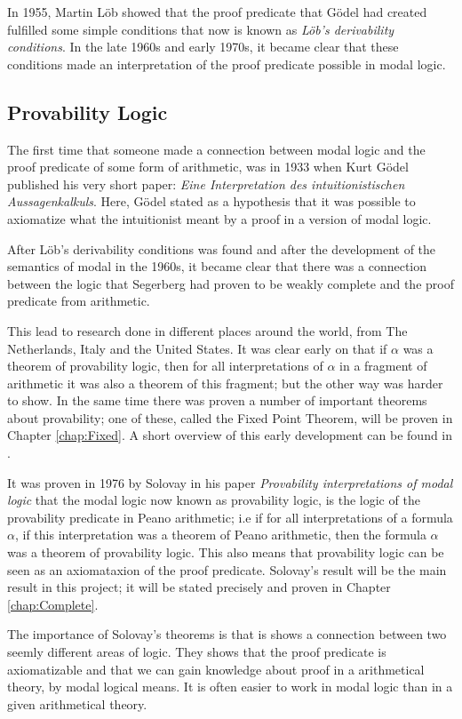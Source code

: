 \documentclass[../main.tex]{subfiles}
\begin{document}
In 1955, Martin Löb showed that the proof predicate that Gödel had created
fulfilled some simple conditions that now is known as \textit{Löb's derivability
conditions}. In the late 1960s and early 1970s, it became clear that these
conditions made an interpretation of the proof predicate possible in modal
logic.


\subsection{Provability Logic}
The first time that someone made a connection between modal logic and the proof
predicate of some form of arithmetic, was in 1933 when Kurt Gödel published his very short  paper:
\textit{Eine
Interpretation des intuitionistischen Aussagenkalkuls}. Here, Gödel
stated as a  hypothesis that it was possible to axiomatize what the
intuitionist meant by a proof in a version of modal logic.

After Löb's derivability conditions was found and after the development of the
semantics of modal in the 1960s, it became clear that there was a connection
between the logic that Segerberg had proven to be weakly complete and the proof
predicate from arithmetic.

This lead to research done in different places around the world, from The
Netherlands, Italy and the United States. It was clear early on that if
$\alpha$ was a theorem of provability logic, then for all interpretations of
$\alpha$ in a fragment of arithmetic it  was also a theorem of this fragment; but
the other way was harder to show. In the same time there was proven a number of
important theorems about provability; one of these, called the Fixed Point
Theorem,  will be proven in Chapter
\ref{chap:Fixed}.
A short overview of this early
development can be found in \citet{Bool1991}.

It was proven in 1976 by Solovay in his paper \textit{Provability
interpretations of modal logic} that the modal
logic now known as provability logic, is the logic of the provability predicate
in Peano arithmetic; i.e if for all interpretations
of a formula $\alpha$, if this interpretation was a theorem of Peano
arithmetic,
then the formula $\alpha$ was a theorem of provability logic. This also means that
provability logic can be seen as an axiomataxion of the proof predicate.
Solovay's result will be the main result in this project; it will be stated
precisely and proven in Chapter \ref{chap:Complete}.

The importance of Solovay's theorems is that is shows a connection between two
seemly different areas of logic. They shows that the proof predicate is
axiomatizable and that we can gain knowledge about proof in a arithmetical
theory, by modal logical means. It is often easier to work in modal logic than
in a given arithmetical theory.
\end{document}
